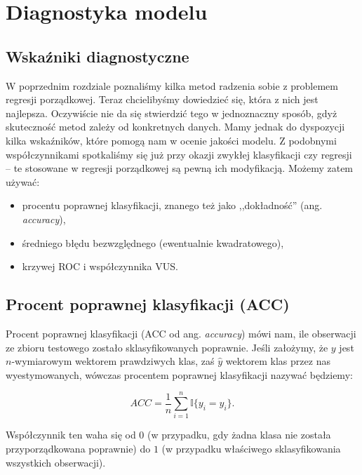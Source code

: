 \documentclass{mini}
\begin{document}

\chapter{Diagnostyka modelu}\label{rozdz2}

\section{Wskaźniki diagnostyczne}

W poprzednim rozdziale poznaliśmy kilka metod radzenia sobie z problemem regresji porządkowej. Teraz chcielibyśmy dowiedzieć się, która z nich jest najlepsza. Oczywiście nie da się stwierdzić tego w jednoznaczny sposób, gdyż skuteczność metod zależy od konkretnych danych. Mamy jednak do dyspozycji kilka wskaźników, które pomogą nam w ocenie jakości modelu. Z podobnymi współczynnikami spotkaliśmy się już przy okazji zwykłej klasyfikacji czy regresji -- te stosowane w regresji porządkowej są pewną ich modyfikacją. Możemy zatem używać:
\begin{itemize}
	\item procentu poprawnej klasyfikacji, znanego też jako ,,dokładność'' (ang. \textit{accuracy}),
	\item średniego błędu bezwzględnego (ewentualnie kwadratowego),
	\item krzywej ROC i współczynnika VUS.	
\end{itemize} 

\section{Procent poprawnej klasyfikacji (ACC)}

Procent poprawnej klasyfikacji (ACC od ang. \textit{accuracy}) mówi nam, ile obserwacji ze zbioru testowego zostało sklasyfikowanych poprawnie. Jeśli założymy, że $y$ jest $n$-wymiarowym wektorem prawdziwych klas, zaś $\hat{y}$ wektorem klas przez nas wyestymowanych, wówczas procentem poprawnej klasyfikacji nazywać będziemy:

\begin{equation}\label{dop1}
ACC = \frac{1}{n}\sum_{i=1}^n \mathbb{I}{\lbrace y_i=\hat{y}_i \rbrace}.
\end{equation}

Współczynnik ten waha się od $0$ (w przypadku, gdy żadna klasa nie została przyporządkowana poprawnie) do $1$ (w przypadku właściwego sklasyfikowania wszystkich obserwacji).
\end{document}

